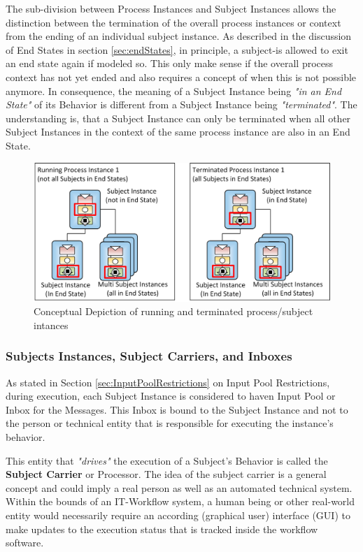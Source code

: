The sub-division between Process Instances and Subject Instances allows the distinction between the termination of the overall process instances or context from the ending of an individual subject instance. As described in the discussion of End States in section \ref{sec:endStates}, in principle, a subject-is allowed to exit an end state again if modeled so. This only make sense if the overall process context has not yet ended and also requires a concept of when this is not possible anymore. In consequence, the meaning of a Subject Instance being \textit{"in an End State"} of its Behavior is different from a Subject Instance being \textit{"terminated"}. The understanding is, that a Subject Instance can only be terminated when all other Subject Instances in the context of the same process instance are also in an End State.


\begin{figure}[htbp]
	\centering
	\includegraphics[width=0.9\linewidth]{Figures/PASSExecutionConceptIntanceTermination.png}
	\caption[Conceptual Depiction of running and terminated process/subject intances]{Conceptual Depiction of running and terminated process/subject intances}
	\label{fig:runningAndTerminatedInstances}
\end{figure}


\subsubsection{Subjects Instances, Subject Carriers, and Inboxes}
\label{sec:subjectCarrier} 

As stated in Section \ref{sec:InputPoolRestrictions} on Input Pool Restrictions, during execution, each Subject Instance is considered to haven Input Pool or Inbox for the Messages. This Inbox is bound to the Subject Instance and not to the person or technical entity that is responsible for executing the instance's behavior.

This entity that \textit{"drives"} the execution of a Subject's Behavior is called the \textbf{Subject Carrier} or Processor. The idea of the subject carrier is a general concept and could imply a real person as well as an automated technical system. Within the bounds of an IT-Workflow system, a human being or other real-world entity would necessarily require an according (graphical user) interface (GUI) to make updates to the execution status that is tracked inside the workflow software.

